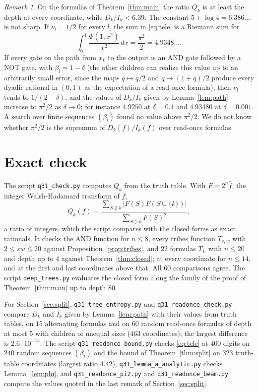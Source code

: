 \documentclass[11pt]{amsart}
\theoremstyle{definition}\newtheorem{definition}[theorem]{Definition}
\theoremstyle{remark}\newtheorem{remark}[theorem]{Remark}
\newcommand{\hf}{\widehat{f}}
\begin{document}
\begin{remark}
On the formulas of Theorem~\ref{thm:main} the ratio $Q_k$ is at least the depth at every coordinate, while
$D_k/I_k<6.39$. The constant $5+\log4=6.386\ldots$ is not sharp. If $\nu_l=1/2$ for every $l$, the sum in \eqref{eq:tele} is a
Riemann sum for
\[
\int_0^1\frac{\Phi(1,x^2)}{x^2}\,dx=\frac{\pi^2}{2}=4.9348\ldots .
\]
If every gate on the path from $x_k$ to the output is an AND gate followed by a NOT gate, with $\beta_l=1-\delta$
(the other children can realize this value up to an arbitrarily small error, since the maps $q\mapsto q/2$ and
$q\mapsto(1+q)/2$ produce every dyadic rational in $(0,1)$ as the expectation of a read-once formula), then $\nu_l$
tends to $1/(2-\delta)$, and the values of
$D_k/I_k$ given by Lemma~\ref{lem:path} increase to $\pi^2/2$ as $\delta\to0$; for instance $4.9250$ at
$\delta=0.1$ and $4.93480$ at $\delta=0.001$. A search over finite sequences $(\beta_l)$ found no value above $\pi^2/2$.
We do not know whether $\pi^2/2$ is the supremum of $D_k(f)/I_k(f)$ over read-once formulas.
\end{remark}

\section{Exact check}\label{sec:check}

The script \texttt{q31\_check.py} computes $Q_k$ from the truth table. With $F=2^n\hf$, the integer Walsh-Hadamard
transform of $f$,
\[
Q_k(f)=\frac{\sum_{S\not\ni k}|F(S)F(S\cup\{k\})|}{\sum_{S\ni k}F(S)^2},
\]
a ratio of integers, which the script compares with the closed forms as exact rationals. It checks the AND function
for $n\le8$, every tribes function $T_{s,w}$ with $2\le sw\le20$ against Proposition~\ref{prop:tribes}, and $22$
formulas $T_L$ with $n\le20$ and depth up to $4$ against Theorem~\ref{thm:closed}; at every coordinate for $n\le14$,
and at the first and last coordinates above that. All $60$ comparisons agree. The script \texttt{deep\_trees.py}
evaluates the closed form along the family of the proof of Theorem~\ref{thm:main} up to depth $80$.

For Section~\ref{sec:split}, \texttt{q31\_tree\_entropy.py} and \texttt{q31\_readonce\_check.py} compare $D_k$ and
$I_k$ given by Lemma~\ref{lem:path} with their values from truth tables, on $15$ alternating formulas and on $60$
random read-once formulas of depth at most $5$ with children of unequal sizes ($463$ coordinates); the largest
difference is $2.6\cdot10^{-15}$. The script \texttt{q31\_readonce\_bound.py} checks \eqref{eq:tele} at $400$
digits on $240$ random sequences $(\beta_l)$ and the bound of Theorem~\ref{thm:split} on $323$ truth-table
coordinates (largest ratio $4.42$), \texttt{q31\_lemma\_a\_analytic.py} checks Lemma~\ref{lem:phi}, and
\texttt{q31\_readonce\_pi2.py} and \texttt{q31\_readonce\_beam.py} compute the values quoted in the last remark of
Section~\ref{sec:split}.
\end{document}
